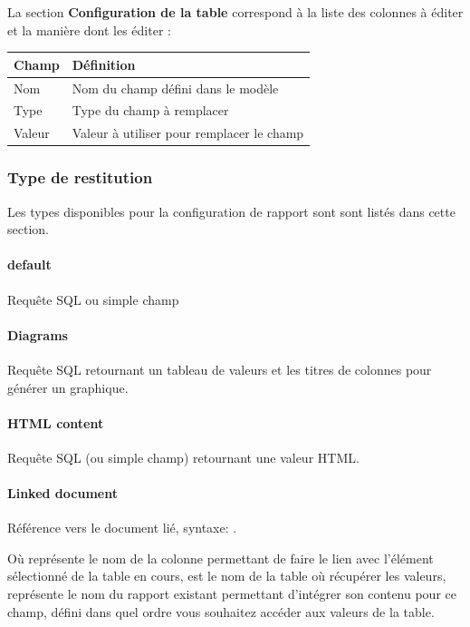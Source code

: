 \documentclass[letterpaper,10pt,french]{sphinxmanual}
\begin{document}
La section \textbf{Configuration de la table} correspond à la liste des
colonnes à éditer et la manière dont les éditer :

\begin{tabulary}{\linewidth}{|L|L|}
\hline

\textbf{Champ}
 & 
\textbf{Définition}
\\
\hline
Nom
 & 
Nom du champ défini dans le modèle
\\
\hline
Type
 & 
Type du champ à remplacer
\\
\hline
Valeur
 & 
Valeur à utiliser pour remplacer le champ
\\
\hline\end{tabulary}



\subsubsection{Type de restitution}
\label{tables/infopanel:type-de-restitution}
Les types disponibles pour la configuration de rapport sont
sont listés dans cette section.


\paragraph{default}
\label{tables/infopanel:default}
Requête SQL ou simple champ


\paragraph{Diagrams}
\label{tables/infopanel:diagrams}
Requête SQL retournant un tableau de valeurs et les titres de colonnes
pour générer un graphique.


\paragraph{HTML content}
\label{tables/infopanel:html-content}
Requête SQL (ou simple champ) retournant une valeur HTML.


\paragraph{Linked document}
\label{tables/infopanel:linked-document}
Référence vers le document lié, syntaxe:
.

Où  représente le nom de la colonne permettant de
faire le lien avec l'élément sélectionné de la table en cours, 
est le nom de la table où récupérer les valeurs, 
représente le nom du rapport existant permettant d'intégrer son
contenu pour ce champ,  défini dans quel ordre vous souhaitez
accéder aux valeurs de la table.
\end{document}
